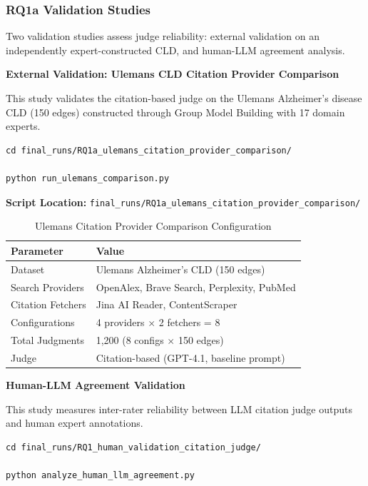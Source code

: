 \subsubsection{RQ1a Validation Studies}
\label{sec:rq1a_validation}

Two validation studies assess judge reliability: external validation on an independently expert-constructed CLD, and human-LLM agreement analysis.

\textbf{External Validation: Ulemans CLD Citation Provider Comparison}

This study validates the citation-based judge on the Ulemans Alzheimer's disease CLD (150 edges) constructed through Group Model Building with 17 domain experts.

\begin{verbatim}
cd final_runs/RQ1a_ulemans_citation_provider_comparison/

python run_ulemans_comparison.py
\end{verbatim}

\textbf{Script Location:} \texttt{final\_runs/RQ1a\_ulemans\_citation\_provider\_comparison/}

\begin{table}[H]
\centering
\caption{Ulemans Citation Provider Comparison Configuration}
\label{tab:ulemans_config}
\footnotesize
\begin{tabular}{@{}ll@{}}
\toprule
\textbf{Parameter} & \textbf{Value} \\
\midrule
Dataset & Ulemans Alzheimer's CLD (150 edges) \\
Search Providers & OpenAlex, Brave Search, Perplexity, PubMed \\
Citation Fetchers & Jina AI Reader, ContentScraper \\
Configurations & 4 providers $\times$ 2 fetchers = 8 \\
Total Judgments & 1,200 (8 configs $\times$ 150 edges) \\
Judge & Citation-based (GPT-4.1, baseline prompt) \\
\bottomrule
\end{tabular}
\end{table}

\textbf{Human-LLM Agreement Validation}

This study measures inter-rater reliability between LLM citation judge outputs and human expert annotations.

\begin{verbatim}
cd final_runs/RQ1_human_validation_citation_judge/

python analyze_human_llm_agreement.py
\end{verbatim}

